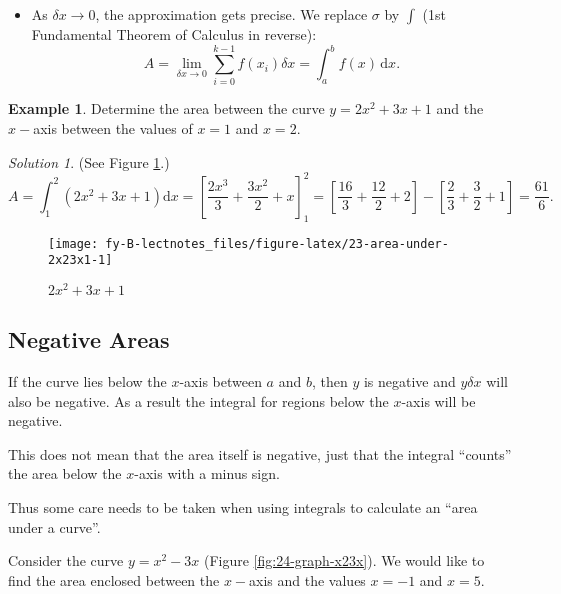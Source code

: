 \documentclass[
  11pt,
  oneside]{book}
\providecommand{\tightlist}{%
  \setlength{\itemsep}{0pt}\setlength{\parskip}{0pt}}
\newcommand{\slide}{}
\theoremstyle{definition}
\theoremstyle{definition}
\newtheorem{example}{Example}[chapter]
\theoremstyle{definition}
\theoremstyle{definition}
\theoremstyle{remark}
\newtheorem*{solution}{Solution}
\begin{document}
\begin{itemize}
\tightlist
\item
  As \(\delta x \to 0\), the approximation gets precise. We replace \(\sigma\) by \(\int\)
  (1st Fundamental Theorem of Calculus in reverse):
  \[
  A =\lim\limits_{\delta x\to 0}\sum_{i=0}^{k-1}f(x_i) \delta x = \int_a^b f(x)\,\mathrm{d}x.
  \]
  \slide
\end{itemize}

\begin{example}
Determine the area between the curve \(y=2x^2+3x+1\) and the \(x-\)axis between the values of \(x=1\) and \(x=2\).
\end{example}

\begin{solution}
\leavevmode

(See Figure \ref{fig:23-area-under-2x23x1}.)
\[
A=\int_1^2(2x^2+3x+1)\mathrm{d}x = \left[\frac{2x^3}{3}+\frac{3x^2}{2}+x\right]_1^2 = \left[\frac{16}{3}+\frac{12}{2}+2\right]-\left[\frac{2}{3}+\frac 32 + 1\right] = \frac{61}{6}.
\]

\begin{figure}

{\centering \texttt{[image: fy-B-lectnotes\_files/figure-latex/23-area-under-2x23x1-1]} 

}

\caption{$2x^2+3x+1$}\label{fig:23-area-under-2x23x1}
\end{figure}

\end{solution}

\slide

\subsection{Negative Areas}\label{negative-areas}

If the curve lies below the \(x\)-axis between \(a\) and \(b\), then \(y\) is negative and \(y\delta x\) will also be negative. As a result the integral for regions below the \(x\)-axis will be negative.

This does not mean that the area itself is negative, just that the integral ``counts'' the area below the \(x\)-axis with a minus sign.

Thus some care needs to be taken when using integrals to calculate an ``area under a curve''.

\slide

Consider the curve \(y = x^2 - 3x\) (Figure \ref{fig:24-graph-x23x}). We would like to find the area enclosed between the \(x-\)axis and the values \(x = -1\) and \(x = 5\).
\end{document}
